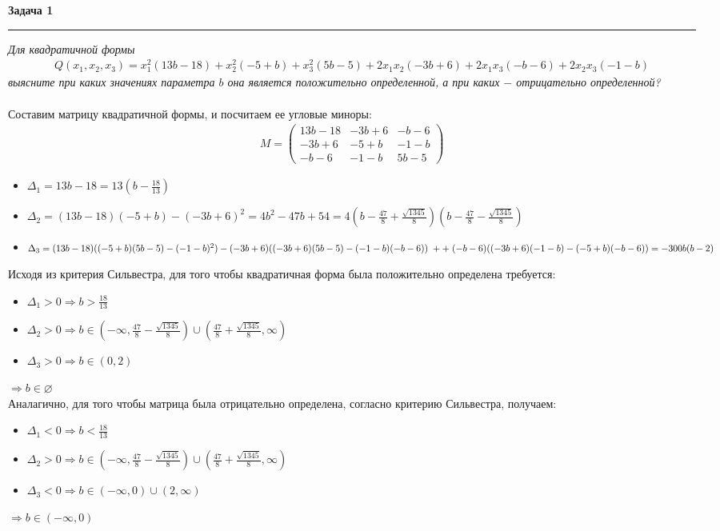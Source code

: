 \documentclass[a4paper,11pt]{article}
\begin{document}
\textbf{\large Задача 1}
\medskip\hrule\medskip
\textit{Для квадратичной формы}
\begin{gather*}
Q(x_1, x_2, x_3) = x_1^2(13b - 18) + x_2^2(-5 + b) + x_3^2(5b - 5) + 2x_1x_2(-3b + 6) + 2x_1x_3(-b - 6) + 2x_2x_3(-1 - b)
\end{gather*}
\textit{выясните при каких значениях параметра $ b $ она является положительно определенной, а при каких $ - $ отрицательно определенной?} \\ \\
Составим матрицу квадратичной формы, и посчитаем ее угловые миноры:
\begin{gather*}
M = 
\begin{pmatrix}
13b - 18 & -3b + 6 & -b - 6 \\[2pt]
-3b + 6 & -5 + b & -1 - b\\[2pt]
-b - 6 & -1 - b & 5b - 5
\end{pmatrix}
\end{gather*}
\begin{itemize}
\item $ \Delta_1 = 13b - 18 = 13(b - \frac{18}{13})$ \\[2pt]
\item $ \Delta_2 = (13b - 18)(-5 + b) - (-3b + 6)^2 = 4 b^2 - 47 b + 54 = 4(b - \frac{47}8 + \frac{\sqrt{1345}}8)(b - \frac{47}8 - \frac{\sqrt{1345}}8)$ \\[2pt]
\item $ \Delta_3 = (13b - 18)((-5 + b)(5b - 5) - (-1 - b)^2) - (-3b + 6)((-3b + 6)(5b - 5) - (-1 - b)(-b - 6)) \; + \\[2pt] 
 + \;(-b - 6)((-3b + 6)(-1 - b) - (-5 + b)(-b - 6)) = -300 b (b - 2) $
\end{itemize}
Исходя из критерия Сильвестра, для того чтобы квадратичная форма была положительно определена требуется:
\begin{itemize}
\item $ \Delta_1 > 0 \Rightarrow b > \frac{18}{13}$
\item $ \Delta_2 > 0 \Rightarrow b \in (-\infty, \frac{47}8 - \frac{\sqrt{1345}}8) \cup (\frac{47}8 + \frac{\sqrt{1345}}8, \infty)$
\item $ \Delta_3 > 0 \Rightarrow b \in (0, 2)$
\end{itemize}
$ \Rightarrow b \in \varnothing $ \\ Аналагично, для того чтобы матрица была отрицательно определена, согласно критерию Сильвестра, получаем:
\begin{itemize}
\item $ \Delta_1 < 0 \Rightarrow b < \frac{18}{13}$
\item $ \Delta_2 > 0 \Rightarrow b \in (-\infty, \frac{47}8 - \frac{\sqrt{1345}}8) \cup (\frac{47}8 + \frac{\sqrt{1345}}8, \infty)$
\item $ \Delta_3 < 0 \Rightarrow b \in (-\infty, 0) \cup (2, \infty)$
\end{itemize}
$ \Rightarrow b \in (-\infty, 0) $
\newpage
\end{document}
